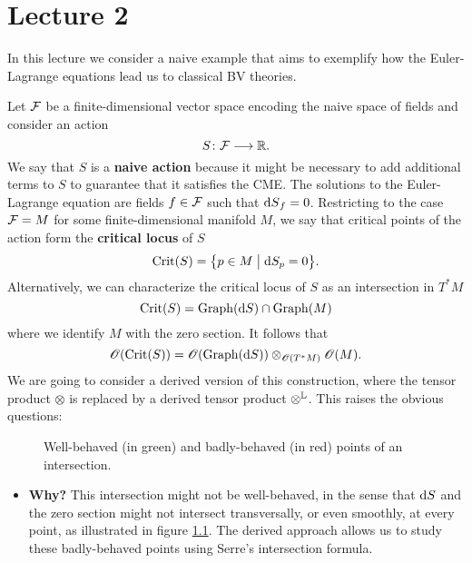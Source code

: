 \chapter{Lecture 2}

In this lecture we consider a naive example that aims to exemplify how the Euler-Lagrange equations lead us to classical BV theories.

\begin{example}
  Let $\mathcal{F}$ be a finite-dimensional vector space encoding the naive space of fields and consider an action
  \begin{equation*}
    S \colon \mathcal{F} \longrightarrow \mathbb{R}.
  \end{equation*}
  We say that $S$ is a \textbf{naive action} because it might be necessary to add additional terms to $S$ to guarantee that it satisfies the CME.
  The solutions to the Euler-Lagrange equation are fields $f \in \mathcal{F}$ such that ${\mathrm{d} S}_f = 0$.
  Restricting to the case $\mathcal{F} = M$ for some finite-dimensional manifold $M$, we say that critical points of the action form the \textbf{critical locus} of $S$
  \begin{equation*}
    \operatorname{Crit} (S) = \bigl\{ p \in M \bigm| \mathrm{d} S_p = 0 \bigr\}.
  \end{equation*}
  Alternatively, we can characterize the critical locus of $S$ as an intersection in $T^* M$
  \begin{equation*}
    \operatorname{Crit} (S) = \operatorname{Graph}( \mathrm{d} S) \cap \operatorname{Graph} (M)
  \end{equation*}
  where we identify $M$ with the zero section. It follows that
  \begin{equation*}
    \mathscr{O}( \operatorname{Crit} (S) ) =
    \mathscr{O}( \operatorname{Graph} (\mathrm{d} S ) ) \otimes_{\mathscr{O}(T^* M)} \mathscr{O}(M).
  \end{equation*}
  We are going to consider a derived version of this construction, where the tensor product $\otimes$ is replaced by a derived tensor product $\otimes^{\mathbb{L}}$. This raises the obvious questions:
  \begin{figure}[ht]
    
    \centering
    \caption{Well-behaved (in green) and badly-behaved (in red) points of an intersection.}
    \label{fig:bad_intersections}
  \end{figure}
  \begin{itemize}
    \item \textbf{Why?} This intersection might not be well-behaved, in the sense that $\mathrm{d} S$ and the zero section might not intersect transversally, or even smoothly, at every point, as illustrated in figure \ref{fig:bad_intersections}. The derived approach allows us to study these badly-behaved points using Serre's intersection formula.

\end{itemize}
\end{example}
